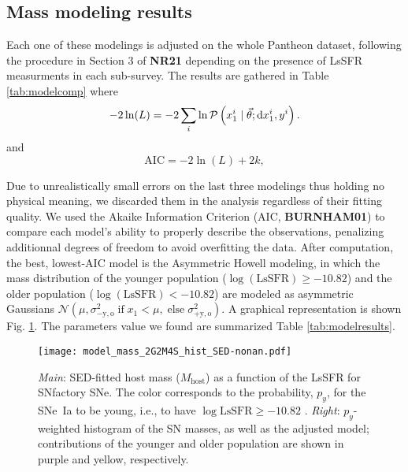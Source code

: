 \documentclass[../main/main.tex]{subfiles}
\begin{document}
\subsection{Mass modeling results}

Each one of these modelings is adjusted on the whole Pantheon dataset,
following the procedure in Section 3 of \textbf{NR21} depending on the presence
of LsSFR measurments in each sub-survey. The results are gathered in Table
\ref{tab:modelcomp} where 
\begin{equation}\label{eq:likelihood}
    -2\ln(L) = -2 \sum_i \ln \mathcal{P}\left(x_1^i \mid \vec{\theta};
    \mathrm{d}x_1^i, y^i\right).
\end{equation}
and 
\begin{equation}
    \mathrm{AIC} = -2\ln(L) + 2k,
\end{equation}

Due to unrealistically small errors on the last three modelings thus holding no
physical meaning, we discarded them in the analysis regardless of their fitting
quality. We used the Akaike Information Criterion (AIC, \textbf{BURNHAM01}) to
compare each model's ability to properly describe the observations, penalizing
additionnal degrees of freedom to avoid overfitting the data. After computation,
the best, lowest-AIC model is the Asymmetric Howell modeling, in which the mass
distribution of the younger population ($\log(\mathrm{LsSFR}) \geq -10.82$) and
the older population ($\log(\mathrm{LsSFR}) < -10.82$) are modeled as asymmetric
Gaussians $\mathcal{N}\left(\mu, \sigma_{-\mathrm{y,o}}^2\; \text{if}
\;x_1<\mu,\; \text{else} \;\sigma_{+\mathrm{y,o}}^2\right)$. A graphical
representation is shown Fig. \ref{fig:massmodel}. The parameters value we found
are summarized Table \ref{tab:modelresults}.

\begin{figure}[]
    \centering
    \texttt{[image: model\_mass\_2G2M4S\_hist\_SED-nonan.pdf]}
    \caption{\textit{Main}: SED-fitted host mass ($M_\mathrm{host}$) as a
        function of the LsSFR for SNfactory SNe. The color corresponds to the
        probability, $p_y$, for the SNe~Ia to be young, i.e., to have
        $\log\mathrm{LsSFR} \geq -10.82$ \citep[see][]{rigault2020}.
    \textit{Right}: $p_y$-weighted histogram of the SN masses, as well as the
adjusted model; contributions of the younger and older population are shown in
purple and yellow, respectively.}
    \label{fig:massmodel}
\end{figure}
\end{document}
